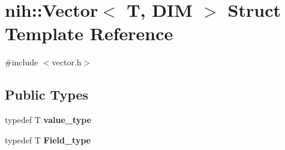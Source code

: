 \hypertarget{structnih_1_1_vector}{
\section{nih\-:\-:\-Vector$<$ \-T, \-D\-I\-M $>$ \-Struct \-Template \-Reference}
\label{structnih_1_1_vector}
}


{\ttfamily \#include $<$vector.\-h$>$}

\subsection*{\-Public \-Types}
\begin{DoxyCompactItemize}
\item 
\hypertarget{structnih_1_1_vector_a75ba24bd1681ba209464cd764dafa4b4}{
typedef \-T {\bfseries value\-\_\-type}}
\label{structnih_1_1_vector_a75ba24bd1681ba209464cd764dafa4b4}

\item 
\hypertarget{structnih_1_1_vector_ac859574cf9880a20ea7a474a22c8514d}{
typedef \-T {\bfseries \-Field\-\_\-type}}
\label{structnih_1_1_vector_ac859574cf9880a20ea7a474a22c8514d}

\end{DoxyCompactItemize}
